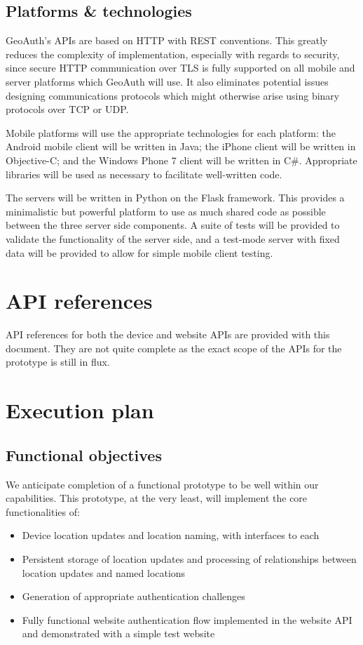 \documentclass[11pt]{article} %
\begin{document}
\subsection{Platforms \& technologies}
GeoAuth's APIs are based on HTTP with REST conventions. This greatly reduces the complexity of implementation, especially with regards to security, since secure HTTP communication over TLS is fully supported on all mobile and server platforms which GeoAuth will use. It also eliminates potential issues designing communications protocols which might otherwise arise using binary protocols over TCP or UDP.

Mobile platforms will use the appropriate technologies for each platform: the Android mobile client will be written in Java; the iPhone client will be written in Objective-C; and the Windows Phone 7 client will be written in C\#. Appropriate libraries will be used as necessary to facilitate well-written code.

The servers will be written in Python on the Flask framework. This provides a minimalistic but powerful platform to use as much shared code as possible between the three server side components. A suite of tests will be provided to validate the functionality of the server side, and a test-mode server with fixed data will be provided to allow for simple mobile client testing.

\section{API references}
API references for both the device and website APIs are provided with this document. They are not quite complete as the exact scope of the APIs for the prototype is still in flux.

\section{Execution plan}
\subsection{Functional objectives}
We anticipate completion of a functional prototype to be well within our capabilities. This prototype, at the very least, will implement the core functionalities of:

\begin{itemize}
\item Device location updates and location naming, with interfaces to each
\item Persistent storage of location updates and processing of relationships between location updates and named locations
\item Generation of appropriate authentication challenges
\item Fully functional website authentication flow implemented in the website API and demonstrated with a simple test website

\end{itemize}
\end{document}
